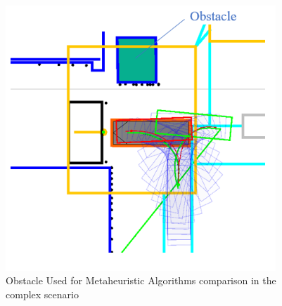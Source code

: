 \begin{figure}[H]
    \begin{center}
        \includegraphics[width=4in]{images/Chap3/obstacle_complicated.png} %
        \caption{Obstacle Used for Metaheuristic Algorithms comparison in the complex scenario}
        \label{OptResult9}
        \end{center}    
\end{figure}

\begin{table}[H]
    \centering
    \caption{Comparison of Planning Time for Different Algorithms in Simple and Complex Environments (in milliseconds)}
    \label{tab:planning_time}
\end{table}

